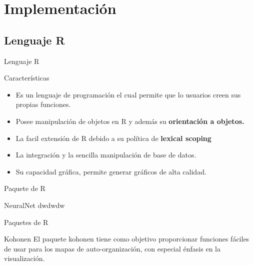 \documentclass{beamer}
\begin{document}
\section{Implementación}
\subsection{Lenguaje R}
\begin{frame}{Lenguaje R}
\begin{block}{Características}
\begin{itemize}
\item Es un lenguaje de programación el cual permite que lo usuarios creen sus propias funciones.
\item Posee manipulación de objetos en R y además su \textbf{orientación a objetos.}
\item La facil extensión de R debido a su política de \textbf{lexical scoping}
\item La integración y la sencilla manipulación de base de datos.
\item Su capacidad gráfica, permite generar gráficos de alta calidad.\\
\end{itemize}
\end{block}
\end{frame}

\begin{frame}{Paquete de R}
\begin{block}{NeuralNet}
dwdwdw
\end{block}
\end{frame}


\begin{frame}{Paquetes de R}
\begin{block}{Kohonen}
El paquete kohonen tiene como objetivo proporcionar funciones fáciles de usar para los mapas de auto-organización, con especial énfasis en la visualización.
\end{block}
\end{frame}
\end{document}
